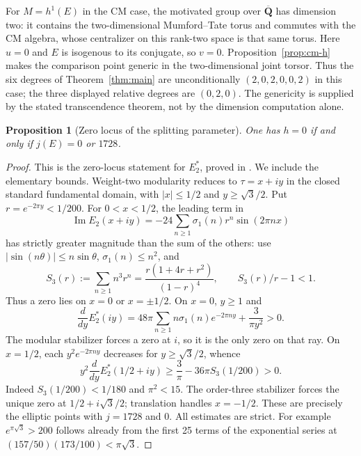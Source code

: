 \documentclass[11pt]{article}
\newtheorem{proposition}[theorem]{Proposition}
\theoremstyle{definition}\newtheorem{definition}[theorem]{Definition}
\theoremstyle{remark}\newtheorem{remark}[theorem]{Remark}
\newcommand{\Qb}{\overline{\mathbf Q}}\newcommand{\Fp}{\mathbf F_p}
\begin{document}
For $M=h^1(E)$ in the CM case, the motivated group over $\Qb$ has dimension two: it contains the two-dimensional Mumford--Tate torus and commutes with the CM algebra, whose centralizer on this rank-two space is that same torus. Here $u=0$ and $E$ is isogenous to its conjugate, so $v=0$. Proposition~\ref{prop:cm-h} makes the comparison point generic in the two-dimensional joint torsor. Thus the six degrees of Theorem~\ref{thm:main} are unconditionally $(2,0,2,0,0,2)$ in this case; the three displayed relative degrees are $(0,2,0)$. The genericity is supplied by the stated transcendence theorem, not by the dimension computation alone.

\begin{proposition}[Zero locus of the splitting parameter]\label{prop:h-zero}
One has $h=0$ if and only if $j(E)=0$ or $1728$.
\end{proposition}
\begin{proof}
This is the zero-locus statement for $E_2^*$, proved in \cite[Lemma 8.1, pp.~25--26]{SebbarBesrour}. We include the elementary bounds. Weight-two modularity reduces to $\tau=x+iy$ in the closed standard fundamental domain, with $|x|\le1/2$ and $y\ge\sqrt3/2$. Put $r=e^{-2\pi y}<1/200$. For $0<x<1/2$, the leading term in
\[
 \operatorname{Im}E_2(x+iy)=-24\sum_{n\ge1}\sigma_1(n)r^n\sin(2\pi nx)
\]
has strictly greater magnitude than the sum of the others: use $|\sin(n\theta)|\le n\sin\theta$, $\sigma_1(n)\le n^2$, and
\[
 S_3(r):=\sum_{n\ge1}n^3r^n=\frac{r(1+4r+r^2)}{(1-r)^4},
 \qquad S_3(r)/r-1<1.
\]
Thus a zero lies on $x=0$ or $x=\pm1/2$. On $x=0$, $y\ge1$ and
\[
 \frac d{dy}E_2^*(iy)=48\pi\sum_{n\ge1}n\sigma_1(n)e^{-2\pi ny}
                  +\frac3{\pi y^2}>0.
\]
The modular stabilizer forces a zero at $i$, so it is the only zero on that ray. On $x=1/2$, each $y^2e^{-2\pi ny}$ decreases for $y\ge\sqrt3/2$, whence
\[
 y^2\frac d{dy}E_2^*(1/2+iy)\ge\frac3\pi-36\pi S_3(1/200)>0.
\]
Indeed $S_3(1/200)<1/180$ and $\pi^2<15$. The order-three stabilizer forces the unique zero at $1/2+i\sqrt3/2$; translation handles $x=-1/2$. These are precisely the elliptic points with $j=1728$ and $0$. All estimates are strict. For example $e^{\pi\sqrt3}>200$ follows already from the first 25 terms of the exponential series at $(157/50)(173/100)<\pi\sqrt3$.
\end{proof}
\end{document}
